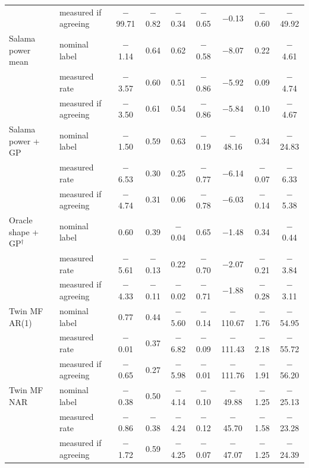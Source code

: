 \begin{tabular}{@{}llccccccc@{}}
 & measured if agreeing & $-$99.71 & $-$0.82 & $-$0.34 & $-$0.65 & $-$0.13 & $-$0.60 & $-$49.92 \\
\addlinespace[1pt]
Salama power mean & nominal label & $-$1.14 & 0.64 & 0.62 & $-$0.58 & $-$8.07 & 0.22 & $-$4.61 \\
 & measured rate & $-$3.57 & 0.60 & 0.51 & $-$0.86 & $-$5.92 & 0.09 & $-$4.74 \\
 & measured if agreeing & $-$3.50 & 0.61 & 0.54 & $-$0.86 & $-$5.84 & 0.10 & $-$4.67 \\
\addlinespace[1pt]
Salama power + GP & nominal label & $-$1.50 & 0.59 & 0.63 & $-$0.19 & $-$48.16 & 0.34 & $-$24.83 \\
 & measured rate & $-$6.53 & 0.30 & 0.25 & $-$0.77 & $-$6.14 & $-$0.07 & $-$6.33 \\
 & measured if agreeing & $-$4.74 & 0.31 & 0.06 & $-$0.78 & $-$6.03 & $-$0.14 & $-$5.38 \\
\addlinespace[1pt]
Oracle shape + GP$^\dagger$ & nominal label & 0.60 & 0.39 & $-$0.04 & 0.65 & $-$1.48 & 0.34 & $-$0.44 \\
 & measured rate & $-$5.61 & $-$0.13 & 0.22 & $-$0.70 & $-$2.07 & $-$0.21 & $-$3.84 \\
 & measured if agreeing & $-$4.33 & $-$0.11 & $-$0.02 & $-$0.71 & $-$1.88 & $-$0.28 & $-$3.11 \\
\addlinespace[1pt]
Twin MF AR(1) & nominal label & 0.77 & 0.44 & $-$5.60 & $-$0.14 & $-$110.67 & $-$1.76 & $-$54.95 \\
 & measured rate & $-$0.01 & 0.37 & $-$6.82 & $-$0.09 & $-$111.43 & $-$2.18 & $-$55.72 \\
 & measured if agreeing & $-$0.65 & 0.27 & $-$5.98 & $-$0.01 & $-$111.76 & $-$1.91 & $-$56.20 \\
\addlinespace[1pt]
Twin MF NAR & nominal label & $-$0.38 & 0.50 & $-$4.14 & $-$0.10 & $-$49.88 & $-$1.25 & $-$25.13 \\
 & measured rate & $-$0.86 & $-$0.38 & $-$4.24 & $-$0.12 & $-$45.70 & $-$1.58 & $-$23.28 \\
 & measured if agreeing & $-$1.72 & 0.59 & $-$4.25 & $-$0.07 & $-$47.07 & $-$1.25 & $-$24.39 \\
\bottomrule
\end{tabular}
